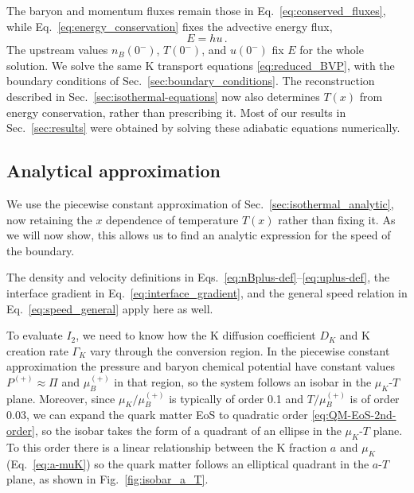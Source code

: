 \documentclass[10pt,superscriptaddress,
amsmath,aps,prc,twocolumn,nofootinbib,floatfix]{revtex4-1}
\newcommand{\mga}[1]{{\color[rgb]{0.6,0,0}#1}}
\newcommand{\AHcom}[1]{\textsf{\color{cyan}{\textsuperscript{AH}#1}}}
\newcommand{\LBcom}[1]{\textsf{\color{blue}[\textsuperscript{LB}#1]}}
\newcommand{\JS}[1]{{\color{violet}#1}}
\newcommand{\JScom}[1]{\textsf{\color{violet} [\textsuperscript{JS}#1]}}
\begin{document}

\JS{The baryon and momentum fluxes remain those in Eq.~\eqref{eq:conserved_fluxes}, while Eq.~\eqref{eq:energy_conservation} fixes the advective energy flux,
\begin{equation}
 E=hu\,.
 \label{eq:energy_flux_adiabatic}
\end{equation}
The upstream values $n_B(0^-)$, $T(0^-)$, and $u(0^-)$ fix $E$ for the whole solution.
We solve the same K transport equations \eqref{eq:reduced_BVP}, with the boundary conditions of Sec.~\ref{sec:boundary_conditions}.
The reconstruction described in Sec.~\ref{sec:isothermal-equations} now also determines }\mga{$T(x)$}\JS{ from energy conservation, rather than prescribing it.}
\JS{Most of our results in Sec.~\ref{sec:results} were obtained by solving these adiabatic equations numerically.}

\subsection{Analytical approximation}
\label{sec:hydro_analytic}

We use the piecewise constant approximation of Sec.~\ref{sec:isothermal_analytic}, now retaining the $x$ dependence of temperature $T(x)$ rather than fixing it.
As we will now show, this allows us to find an analytic expression for the speed of the boundary.

\JS{The density and velocity definitions in Eqs.~\eqref{eq:nBplus-def}--\eqref{eq:uplus-def}, the interface gradient in Eq.~\eqref{eq:interface_gradient}, and the general speed relation in Eq.~\eqref{eq:speed_general} apply here as well.}

To evaluate $I_2$, we need to know how the K diffusion coefficient $D_K$ and K creation rate $\Gamma_K$ vary through the conversion region.
In the piecewise constant approximation the pressure and baryon chemical potential have constant values $P^{(+)}\approx\Pi$ and $\mu_B^{(+)}$ in that region, so the system follows an isobar in the $\mu_K$-$T$ plane.
Moreover, since $\mu_K/\mu_B^{(+)}$ is typically of order 0.1 and $T/\mu_B^{(+)}$ is of order 0.03, we can expand the quark matter EoS to quadratic order \eqref{eq:QM-EoS-2nd-order}, so the isobar takes the form of a quadrant of an ellipse in the $\mu_K$-$T$ plane.
%
To this order there is a linear relationship between the K fraction $a$ and $\mu_K$ (Eq.~\eqref{eq:a-muK}) so the quark matter follows an elliptical quadrant in the $a$-$T$ plane, as shown in Fig.~\ref{fig:isobar_a_T}.
\end{document}
